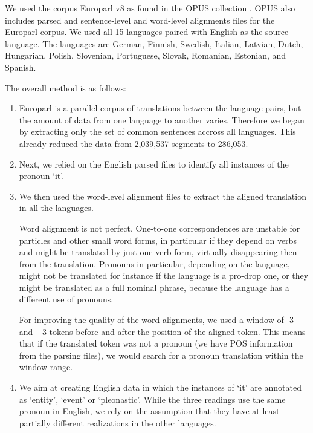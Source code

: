 \documentclass[10pt, a4paper]{article} \usepackage{lrec} \usepackage{multibib}
\begin{document}
We used the corpus Europarl \cite{Koehn2005} v8 as found in the OPUS collection
\cite{TIEDEMANN12.463}. OPUS also includes parsed and sentence-level and
word-level alignments files for the Europarl corpus. We used all 15 languages
paired with English as the source language. The languages are German, Finnish, Swedish, Italian, Latvian, Dutch, Hungarian, Polish, Slovenian, Portuguese, Slovak, Romanian, Estonian, and Spanish.  

The overall method is as follows:

\begin{enumerate}\setlength\itemsep{1em}

\item Europarl is a parallel corpus of translations
between the language pairs, but the amount of data from one language to another
varies. Therefore we began by extracting only the set of common sentences
accross all languages. This already reduced the data from 2,039,537 segments to
286,053.

\item  Next, we relied on the English parsed files to
identify all instances of the pronoun `it'.

\item We then used the word-level alignment files to
extract the aligned translation in all the languages.

Word alignment is not perfect. One-to-one correspondences are unstable for
particles and other small word forms, in particular if they depend on verbs and might
be translated by just one verb form, virtually disappearing then from the
translation. Pronouns in particular, depending on the language, might not be
translated for instance if the language is a pro-drop one, or they might be
translated as a full nominal phrase, because the language has a different use of
pronouns.

For improving the quality of the word alignments, we used a window of -3 and
+3 tokens before and after the position of the aligned token. This means that if
the translated token was not a pronoun (we have POS information from the parsing
files), we would search for a pronoun translation within the window range.

\item We aim at creating English data in which the instances of
`it' are annotated as `entity', `event' or `pleonastic'. While the three
readings use the same pronoun in English, we rely on the assumption that they
have at least partially different realizations in the other languages.


\end{enumerate}
\end{document}
